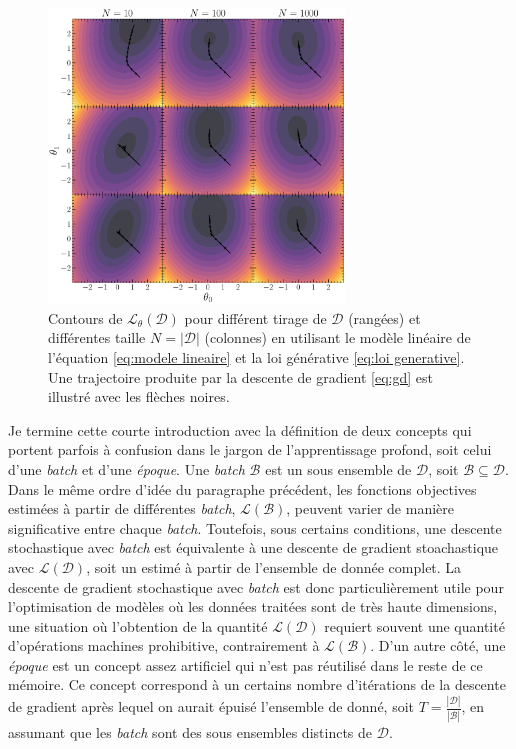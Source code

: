 \begin{figure}[ht!]
        \centering
        \includegraphics[width=0.7\textwidth]{notebooks/monte_carlo_loss.pdf}
        \caption{Contours de $\mathcal{L}_\theta(\mathcal{D})$ pour différent tirage de $\mathcal{D}$ (rangées) et différentes taille $N = |\mathcal{D}|$ (colonnes) 
                en utilisant le modèle linéaire de l'équation \eqref{eq:modele lineaire} et la loi générative \eqref{eq:loi generative}.
        Une trajectoire produite par la descente de gradient \eqref{eq:gd} est illustré avec les flèches noires.}
        \label{fig:monte carlo L}
\end{figure}

Je termine cette courte introduction avec la définition de deux concepts qui portent parfois à confusion 
dans le jargon de l'apprentissage profond, soit celui d'une \textit{batch} et d'une \textit{époque}.  
Une \textit{batch} $\mathcal{B}$ est un sous ensemble de $\mathcal{D}$, soit $\mathcal{B} \subseteq \mathcal{D}$. Dans le même ordre d'idée du paragraphe précédent, les fonctions objectives 
estimées à partir de différentes \textit{batch}, $\mathcal{L}(\mathcal{B})$, peuvent varier de manière significative entre chaque \textit{batch}. 
Toutefois, sous certains conditions, une descente stochastique avec \textit{batch} est équivalente à une descente de gradient stoachastique avec $\mathcal{L}(\mathcal{D})$, 
soit un estimé à partir de l'ensemble de donnée complet. La descente de gradient stochastique avec \textit{batch} 
est donc particulièrement utile pour l'optimisation de modèles où les données traitées sont de très haute dimensions, 
une situation où l'obtention de la quantité $\mathcal{L}(\mathcal{D})$ requiert souvent une quantité d'opérations machines prohibitive, contrairement à $\mathcal{L}(\mathcal{B})$.
D'un autre côté, une \textit{époque} est un concept assez artificiel qui n'est pas réutilisé dans le reste de ce mémoire. Ce concept correspond à un 
certains nombre d'itérations de la descente de gradient après lequel on aurait épuisé l'ensemble de donné, soit $T = \frac{|\mathcal{D}|}{|\mathcal{B}|}$, 
en assumant que les \textit{batch} sont des sous ensembles distincts de $\mathcal{D}$. 

